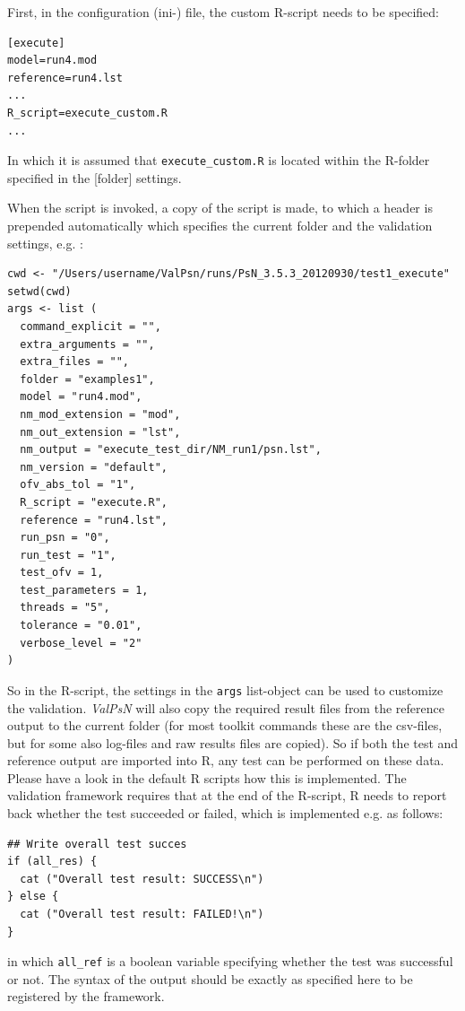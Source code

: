 \documentclass[a4,11pt]{report} \usepackage[pdftex]{graphicx}
\newcommand{\ValPsN}{\textcolor{PiranaOrange}{\textit{ValPsN}}\xspace}
\begin{document}
\noindent First, in the configuration (ini-) file, the custom R-script needs to
be specified:

\begin{lstlisting}
[execute]
model=run4.mod
reference=run4.lst
...
R_script=execute_custom.R
...
\end{lstlisting}

\noindent In which it is assumed that {\tt execute\_custom.R} is located within
the R-folder specified in the {[folder]} settings.

\vspace{10pt}

\noindent When the script is invoked, a copy of the script is made, to which a
header is prepended automatically which specifies the current folder
and the validation settings, e.g. :

\begin{lstlisting}
cwd <- "/Users/username/ValPsn/runs/PsN_3.5.3_20120930/test1_execute"
setwd(cwd)
args <- list (
  command_explicit = "",
  extra_arguments = "",
  extra_files = "",
  folder = "examples1",
  model = "run4.mod",
  nm_mod_extension = "mod",
  nm_out_extension = "lst",
  nm_output = "execute_test_dir/NM_run1/psn.lst",
  nm_version = "default",
  ofv_abs_tol = "1",
  R_script = "execute.R",
  reference = "run4.lst",
  run_psn = "0",
  run_test = "1",
  test_ofv = 1,
  test_parameters = 1,
  threads = "5",
  tolerance = "0.01",
  verbose_level = "2"
)
\end{lstlisting}

\noindent So in the R-script, the settings in the {\tt args}
list-object can be used to customize the validation. \ValPsN will also
copy the required result files from the reference output to the
current folder (for most toolkit commands these are the csv-files, but
for some also log-files and raw results files are copied). So if both
the test and reference output are imported into R, any test can be
performed on these data. Please have a look in the default R scripts how
this is implemented. The validation framework requires that at the end
of the R-script, R needs to report back whether the test succeeded or
failed, which is implemented e.g. as follows:

\begin{lstlisting}
## Write overall test succes
if (all_res) {
  cat ("Overall test result: SUCCESS\n")
} else {
  cat ("Overall test result: FAILED!\n")
}
\end{lstlisting}

\noindent in which {\tt all\_ref} is a boolean variable specifying whether the
test was successful or not. The syntax of the output should be
exactly as specified here to be registered by the framework.
\end{document}
